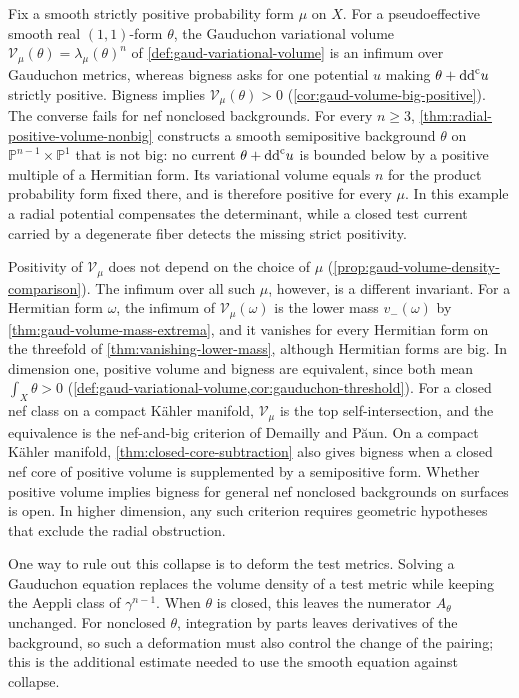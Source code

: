 Fix a smooth strictly positive probability form $\mu$ on $X$. For a pseudoeffective smooth real $(1,1)$-form $\theta$, the Gauduchon variational volume $\mathcal V_\mu(\theta)=\lambda_\mu(\theta)^n$ of \cref{def:gaud-variational-volume} is an infimum over Gauduchon metrics, whereas bigness asks for one potential $u$ making $\theta+\mathrm{dd}^{\mathrm{c}} u$ strictly positive. Bigness implies $\mathcal V_\mu(\theta)>0$ (\cref{cor:gaud-volume-big-positive}). The converse fails for nef nonclosed backgrounds. For every $n\geq3$, \cref{thm:radial-positive-volume-nonbig} constructs a smooth semipositive background $\theta$ on $\mathbb P^{n-1}\times\mathbb P^1$ that is not big: no current $\theta+\mathrm{dd}^{\mathrm{c}} u$ is bounded below by a positive multiple of a Hermitian form. Its variational volume equals $n$ for the product probability form fixed there, and is therefore positive for every $\mu$. In this example a radial potential compensates the determinant, while a closed test current carried by a degenerate fiber detects the missing strict positivity.

Positivity of $\mathcal V_\mu$ does not depend on the choice of $\mu$ (\cref{prop:gaud-volume-density-comparison}). The infimum over all such $\mu$, however, is a different invariant. For a Hermitian form $\omega$, the infimum of $\mathcal V_\mu(\omega)$ is the lower mass $v_-(\omega)$ by \cref{thm:gaud-volume-mass-extrema}, and it vanishes for every Hermitian form on the threefold of \cref{thm:vanishing-lower-mass}, although Hermitian forms are big. In dimension one, positive volume and bigness are equivalent, since both mean $\int_X\theta>0$ (\cref{def:gaud-variational-volume,cor:gauduchon-threshold}). For a closed nef class on a compact K\"ahler manifold, $\mathcal V_\mu$ is the top self-intersection, and the equivalence is the nef-and-big criterion of Demailly and P{\u a}un. On a compact K\"ahler manifold, \cref{thm:closed-core-subtraction} also gives bigness when a closed nef core of positive volume is supplemented by a semipositive form. Whether positive volume implies bigness for general nef nonclosed backgrounds on surfaces is open. In higher dimension, any such criterion requires geometric hypotheses that exclude the radial obstruction.



One way to rule out this collapse is to deform the test metrics. Solving a Gauduchon equation replaces the volume density of a test metric while keeping the Aeppli class of $\gamma^{n-1}$. When $\theta$ is closed, this leaves the numerator $A_\theta$ unchanged. For nonclosed $\theta$, integration by parts leaves derivatives of the background, so such a deformation must also control the change of the pairing; this is the additional estimate needed to use the smooth equation against collapse.


